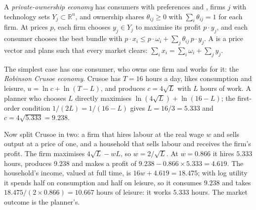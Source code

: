 \begin{definition}\label{def:b2:welfare-theorems:production-economy}
A \emph{private-ownership economy} has consumers with preferences and
, firms $j$ with technology sets $Y_j \subset \mathbb{R}^n$, and ownership shares $\theta_{ij}
\ge 0$ with $\sum_i \theta_{ij} = 1$ for each firm. At prices $p$, each firm chooses $y_j \in Y_j$ to
maximise its profit $p \cdot y_j$, and each consumer chooses the best bundle with $p \cdot x_i \le p \cdot
\omega_i + \sum_j \theta_{ij}\,p \cdot y_j$. A  is a price vector and plans such
that every market clears: $\sum_i x_i = \sum_i \omega_i + \sum_j y_j$.
\end{definition}

The simplest case has one consumer, who owns one firm and works for it: the \emph{Robinson Crusoe
economy}. Crusoe has $T = 16$ hours a day, likes consumption and leisure, $u = \ln c + \ln(T - L)$, and
produces $c = 4\sqrt L$ with $L$ hours of work. A planner who chooses $L$ directly maximises $\ln(4\sqrt L)
+ \ln(16 - L)$; the first-order condition $1/(2L) = 1/(16 - L)$ gives $L = 16/3 = 5.333$ and $c = 4\sqrt{5.333}
= 9.238$.

Now split Crusoe in two: a firm that hires labour at the real wage $w$ and sells output at a price of
one, and a household that sells labour and receives the firm's profit. The firm maximises $4\sqrt L - wL$,
so $w = 2/\sqrt L$. At $w = 0.866$ it hires $5.333$ hours, produces $9.238$ and makes a profit of $9.238 -
0.866 \times 5.333 = 4.619$. The household's income, valued at full time, is $16w + 4.619 = 18.475$; with
log utility it spends half on consumption and half on leisure, so it consumes $9.238$ and takes $18.475/
(2 \times 0.866) = 10.667$ hours of leisure: it works $5.333$ hours. The market outcome is the planner's.

